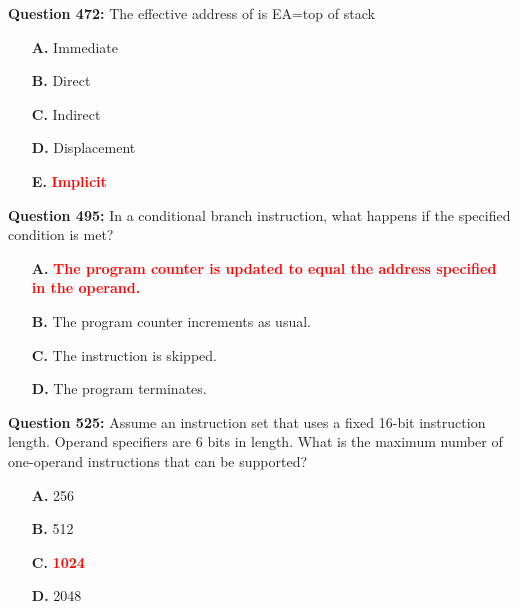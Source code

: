 \documentclass[12pt,a4paper]{article}
\begin{document}
\vspace{0.5cm}

\vspace{0.5cm}

\vspace{0.5cm}

\vspace{0.5cm}

\textbf{Question 472:} The effective address of \underline{\hspace{1.5cm}} is EA=top of stack

\begin{itemize}
    \item[\textbf{A.}] Immediate
    \item[\textbf{B.}] Direct
    \item[\textbf{C.}] Indirect
    \item[\textbf{D.}] Displacement
    \item[\textbf{E.}] \textcolor{red}{\textbf{Implicit}}
\end{itemize}

\vspace{0.5cm}

\vspace{0.5cm}

\textbf{Question 495:} In a conditional branch instruction, what happens if the specified condition is met?

\begin{itemize}
    \item[\textbf{A.}] \textcolor{red}{\textbf{The program counter is updated to equal the address specified in the operand.}}
    \item[\textbf{B.}] The program counter increments as usual.
    \item[\textbf{C.}] The instruction is skipped.
    \item[\textbf{D.}] The program terminates.
\end{itemize}

\vspace{0.5cm}

\vspace{0.5cm}

\textbf{Question 525:} Assume an instruction set that uses a fixed 16-bit instruction length. Operand specifiers are 6 bits in length. What is the maximum number of one-operand instructions that can be supported?

\begin{itemize}
    \item[\textbf{A.}] 256
    \item[\textbf{B.}] 512
    \item[\textbf{C.}] \textcolor{red}{\textbf{1024}}
    \item[\textbf{D.}] 2048
\end{itemize}
\end{document}

